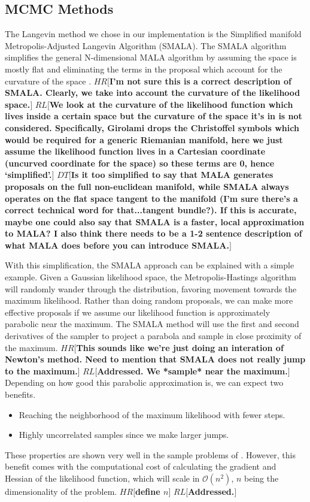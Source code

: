 \documentclass{aa}
\def\memohr#1{\color{blue}$HR[${\bf #1}$]$ \color{black}}
\def\memodt#1{\color{green}$DT[${\bf #1}$]$ \color{black}}
\def\memorl#1{\color{gray}$RL[${\bf #1}$]$ \color{black}}
\begin{document}
\subsection{MCMC Methods}
The Langevin method we chose in our implementation is the Simplified manifold Metropolis-Adjusted Langevin Algorithm (SMALA). 
The SMALA algorithm simplifies the general N-dimensional MALA algorithm by assuming the space is mostly flat and eliminating the terms in the proposal which account for the curvature of the space \citep{Girolami2011}.
\memohr{I'm not sure this is a correct description of SMALA. Clearly, we take into account the curvature of the likelihood space.}
\memorl{We look at the curvature of the likelihood function which lives inside a certain space but the curvature of the space it's in is not considered. Specifically, Girolami drops the Christoffel symbols which would be required for a generic Riemanian manifold, here we just assume the likelihood function lives in a Cartesian coordinate (uncurved coordinate for the space) so these terms are 0, hence `simplified'.}
\memodt{Is it too simplified to say that MALA generates proposals on the full non-euclidean manifold, while SMALA always operates on the flat space tangent to the manifold (I'm sure there's a correct technical word for that...tangent bundle?). If this is accurate, maybe one could also say that SMALA is a faster, local approximation to MALA? I also think there needs to be a 1-2 sentence description of what MALA does before you can introduce SMALA.}

With this simplification, the SMALA approach can be explained with a simple example. 
Given a Gaussian likelihood space, the Metropolis-Hastings algorithm will randomly wander through the distribution, favoring movement towards the maximum likelihood.
Rather than doing random proposals, we can make more effective proposals if we assume our likelihood function is approximately parabolic near the maximum. 
The SMALA method will use the first and second derivatives of the sampler to project a parabola and sample in close proximity of the maximum. 
\memohr{This sounds like we're just doing an interation of Newton's method. Need to mention that SMALA does not really jump to the maximum.}
\memorl{Addressed. We *sample* near the maximum.}
Depending on how good this parabolic approximation is, we can expect two benefits.
\begin{itemize}
\item Reaching the neighborhood of the maximum likelihood with fewer steps.
\item Highly uncorrelated samples since we make larger jumps.
\end{itemize}
These properties are shown very well in the sample problems of \cite{Girolami2011}. 
However, this benefit comes with the computational cost of calculating the gradient and Hessian of the likelihood function, which will scale in $\mathcal{O}(n^2)$, $n$ being the dimensionality of the problem. 
\memohr{define $n$}
\memorl{Addressed.}
\end{document}
